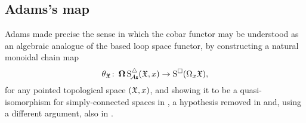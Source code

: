 \subsection{Adams's map}\label{ss:adams maps}

Adams made precise the sense in which the cobar functor may be understood as an algebraic analogue of the based loop space functor, by constructing a natural monoidal chain map
\begin{equation}\label{e:adams map 2}
	\theta_{\mathfrak{X}} \colon \operatorname{\mathbf{\Omega}} \operatorname{S^{\triangle}_{\!{\mathcal{A}\mathsf{s}}}}(\mathfrak{X},x) \to \operatorname{S^{\square}}(\Omega_x \mathfrak{X}),
\end{equation}
for any pointed topological space $(\mathfrak{X},x)$, and showing it to be a quasi-isomorphism for simply-connected spaces in \cite{adams1956cobar}, a hypothesis removed in \cite{rivera2018cubical} and, using a different argument, also in \cite{rivera2019path}.

